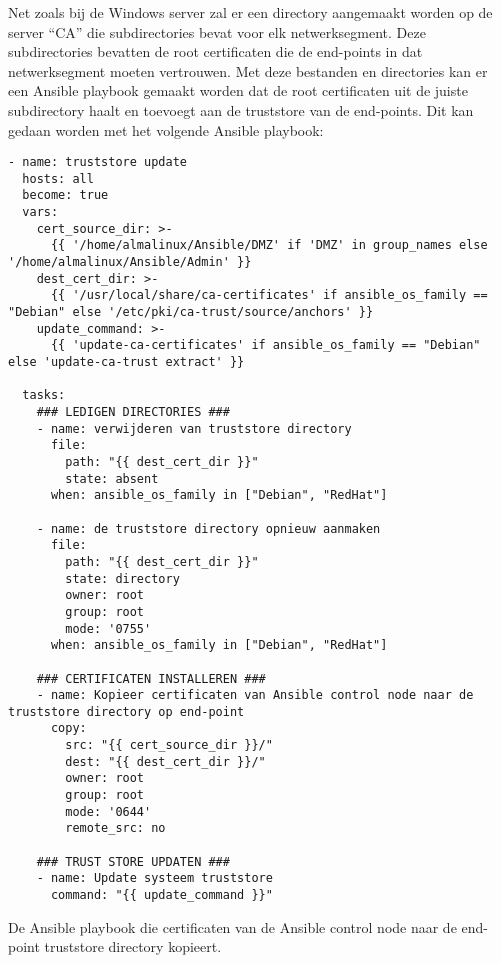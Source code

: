 Net zoals bij de Windows server zal er een directory aangemaakt worden op de server ``CA'' die subdirectories bevat voor elk netwerksegment. Deze subdirectories bevatten de root certificaten die de end-points in dat netwerksegment moeten vertrouwen.
Met deze bestanden en directories kan er een Ansible playbook gemaakt worden dat de root certificaten uit de juiste subdirectory haalt en toevoegt aan de truststore van de end-points. Dit kan gedaan worden met het volgende Ansible playbook:
\begin{listing}[H]
\begin{verbatim}
- name: truststore update
  hosts: all
  become: true
  vars:
    cert_source_dir: >-
      {{ '/home/almalinux/Ansible/DMZ' if 'DMZ' in group_names else '/home/almalinux/Ansible/Admin' }}
    dest_cert_dir: >-
      {{ '/usr/local/share/ca-certificates' if ansible_os_family == "Debian" else '/etc/pki/ca-trust/source/anchors' }}
    update_command: >-
      {{ 'update-ca-certificates' if ansible_os_family == "Debian" else 'update-ca-trust extract' }}

  tasks:
    ### LEDIGEN DIRECTORIES ###
    - name: verwijderen van truststore directory
      file:
        path: "{{ dest_cert_dir }}"
        state: absent
      when: ansible_os_family in ["Debian", "RedHat"]

    - name: de truststore directory opnieuw aanmaken
      file:
        path: "{{ dest_cert_dir }}"
        state: directory
        owner: root
        group: root
        mode: '0755'
      when: ansible_os_family in ["Debian", "RedHat"]

    ### CERTIFICATEN INSTALLEREN ###
    - name: Kopieer certificaten van Ansible control node naar de truststore directory op end-point
      copy:
        src: "{{ cert_source_dir }}/"
        dest: "{{ dest_cert_dir }}/"
        owner: root
        group: root
        mode: '0644'
        remote_src: no

    ### TRUST STORE UPDATEN ###
    - name: Update systeem truststore
      command: "{{ update_command }}"
\end{verbatim}
\caption[Ansible playbook]{De Ansible playbook die certificaten van de Ansible control node naar de end-point truststore directory kopieert.}
\end{listing}

